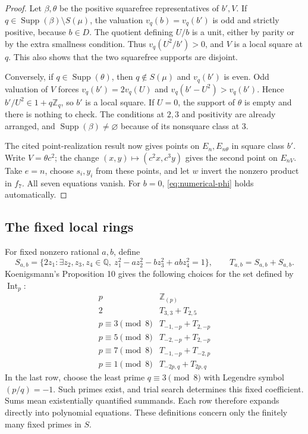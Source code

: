 \documentclass[11pt]{article}
\theoremstyle{definition}
\newcommand{\Q}{\mathbb Q}\newcommand{\Z}{\mathbb Z}
\newcommand{\Int}{\operatorname{Int}}
\newcommand{\Supp}{\operatorname{Supp}}
\begin{document}
\begin{proof}
Let \(\beta,\theta\) be the positive squarefree representatives
of \(b',V\). If \(q\in\Supp(\beta)\setminus S(\mu)\),
the valuation \(v_q(b)=v_q(b')\) is odd and strictly positive,
because \(b\in D\). The quotient defining \(U/b\) is a unit,
either by parity or by the extra smallness condition. Thus
\(v_q(U^2/b')>0\), and \(V\) is a local square at \(q\).
This also shows that the two squarefree supports are disjoint.

Conversely, if \(q\in\Supp(\theta)\), then \(q\notin S(\mu)\)
and \(v_q(b')\) is even. Odd valuation of \(V\) forces
\(v_q(b')=2v_q(U)\) and \(v_q(b'-U^2)>v_q(b')\).
Hence \(b'/U^2\in1+q\Z_q\), so \(b'\) is a local square.
If \(U=0\), the support of \(\theta\) is empty and there is
nothing to check. The conditions at \(2,3\) and positivity are
already arranged, and \(\Supp(\beta)\ne\varnothing\) because
of its nonsquare class at \(3\).

The cited point-realization result now gives points on \(E_n,E_{n\theta}\)
in square class \(b'\). Write \(V=\theta c^2\); the change
\((x,y)\mapsto(c^2x,c^3y)\) gives the second point on
\(E_{nV}\). Take \(e=n\), choose \(s_i,y_i\) from these points,
and let \(w\) invert the nonzero product in \(f_7\). All seven
equations vanish. For \(b=0\), \eqref{eq:numerical-phi} holds
automatically.
\end{proof}

\subsection{The fixed local rings}\label{sec:local-rings}

For fixed nonzero rational \(a,b\), define
\[
 S_{a,b}=\{2z_1:\exists z_2,z_3,z_4\in\Q,
             \ z_1^2-az_2^2-bz_3^2+abz_4^2=1\},
 \qquad T_{a,b}=S_{a,b}+S_{a,b}.
\]
Koenigsmann's Proposition 10 \cite{Koenigsmann} gives the following
choices for the set defined by \(\Int_p\):
\[
\begin{array}{c|l}
 p&\Z_{(p)}\\\hline
 2&T_{3,3}+T_{2,5}\\
 p\equiv3\pmod8&T_{-1,-p}+T_{2,-p}\\
 p\equiv5\pmod8&T_{-2,-p}+T_{2,-p}\\
 p\equiv7\pmod8&T_{-1,-p}+T_{-2,p}\\
 p\equiv1\pmod8&T_{-2p,q}+T_{2p,q}
\end{array}
\]
In the last row, choose the least prime \(q\equiv3\pmod8\) with
Legendre symbol \((p/q)=-1\). Such primes exist, and trial search
determines this fixed coefficient. Sums mean existentially quantified
summands. Each row therefore expands directly into polynomial equations.
These definitions concern only the finitely many fixed primes in \(S\).
\end{document}

